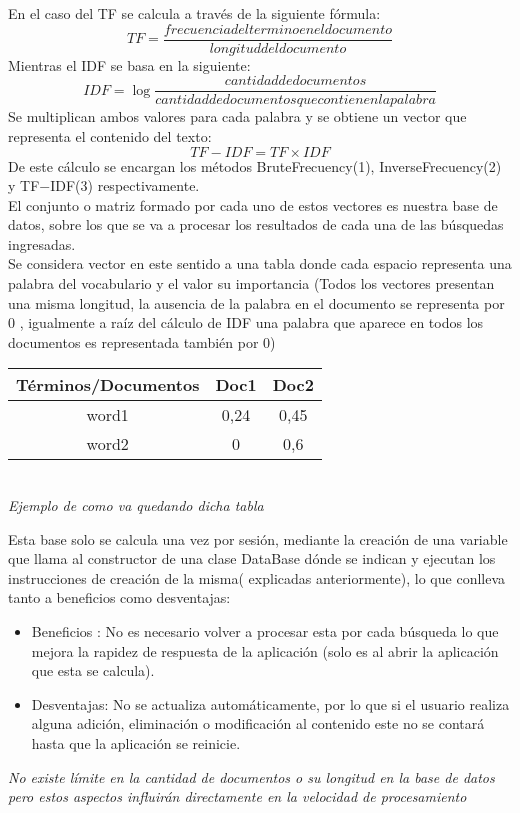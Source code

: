 \documentclass[options]{article}
\begin{document}
En el caso del TF se calcula a través de la siguiente fórmula:\\
\begin{equation}
    TF = \frac{frecuencia del termino en el documento}{longitud del documento}  
\end{equation}
Mientras el IDF se basa en la siguiente:\\
\begin{equation}
    IDF = \log \frac{cantidad de documentos}{cantidad de documentos que contienen la palabra}  
\end{equation}
Se multiplican ambos valores para cada palabra y se obtiene un vector que representa el contenido del texto:\\
\begin{equation}
    TF-IDF = TF\times IDF
\end{equation}
De este cálculo se encargan los métodos BruteFrecuency(1), InverseFrecuency(2) y TF$-$IDF(3) respectivamente.\\
El conjunto o matriz formado por cada uno de estos vectores es nuestra base de datos, sobre los que se va a procesar los resultados de cada una de las búsquedas ingresadas.\\
Se considera vector en este sentido a una tabla donde cada espacio representa una palabra del vocabulario y el valor su importancia (Todos los vectores presentan una misma longitud, la ausencia de la palabra en el documento se representa por 0 , igualmente a raíz del cálculo de IDF una palabra que aparece en todos los documentos es representada también por 0)\\
\begin{center}
    \begin{tabular}{|c|c|c|}
        \hline
        Términos/Documentos & Doc1 & Doc2\\
        \hline
        word1 & 0,24 & 0,45\\
        \hline
        word2 & 0 & 0,6\\
        \hline
    \end{tabular}\\
    \textit{\small{Ejemplo de como va quedando dicha tabla}}
\end{center}
Esta base solo se calcula una vez por sesión, mediante la creación de una variable que llama al constructor de una clase DataBase dónde se indican y ejecutan los instrucciones de creación de la misma( explicadas anteriormente), lo que conlleva tanto a beneficios como desventajas:\\
\begin{itemize}
    \item Beneficios : No es necesario volver a procesar esta por cada búsqueda lo que mejora la rapidez de respuesta de la aplicación (solo es al abrir la aplicación que esta se calcula).
    \item Desventajas: No se actualiza automáticamente, por lo que si el usuario realiza alguna adición, eliminación o modificación al contenido este no se contará hasta que la aplicación se reinicie.
\end{itemize}
\textit{No existe límite en la cantidad de documentos o su longitud en la base de datos pero estos aspectos influirán directamente en la velocidad de procesamiento}
\end{document}
